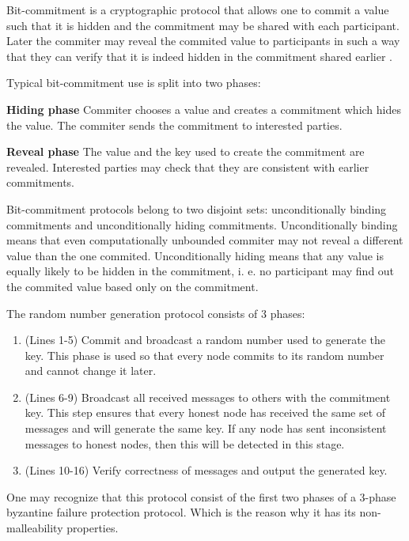 \begin{defin*}
  Bit-commitment \cite[p.220]{gol08} is a cryptographic protocol that allows one
  to commit a value such that it is hidden and the commitment may be shared with
  each participant. Later the commiter may reveal the commited value to
  participants in such a way that they can verify that it is indeed hidden in
  the commitment shared earlier .

  Typical bit-commitment use is split into two phases:
  \begin{description}
    \item{\textbf{Hiding phase}} Commiter chooses a value and creates a
      commitment which hides the value. The commiter sends the commitment to
      interested parties.
    \item{\textbf{Reveal phase}} The value and the key used to create the
      commitment are revealed. Interested parties may check that they are
      consistent with earlier commitments.
  \end{description}

  Bit-commitment protocols belong to two disjoint sets: unconditionally binding
  commitments and unconditionally hiding commitments.
  Unconditionally binding means that even computationally unbounded commiter may
  not reveal a different value than the one commited. 
  Unconditionally hiding means that any value is equally likely to be hidden in
  the commitment, i. e. no participant may find out the commited value based
  only on the commitment.
\end{defin*}

The random number generation protocol consists of 3 phases:
\begin{enumerate}
  \item (Lines 1-5) Commit and broadcast a random number used to generate the
    key. This phase is used so that every node commits to its random number and
    cannot change it later.
  \item (Lines 6-9) Broadcast all received messages to others with the
    commitment key. This step ensures that every honest node has received the
    same set of messages and will generate the same key. If any node has sent
    inconsistent messages to honest
    nodes, then this will be detected in this stage.
  \item (Lines 10-16) Verify correctness of messages and output the generated
    key.
\end{enumerate}

One may recognize that this protocol consist of the first two phases of a
3-phase byzantine failure protection protocol. Which is the reason why it has
its non-malleability properties.

